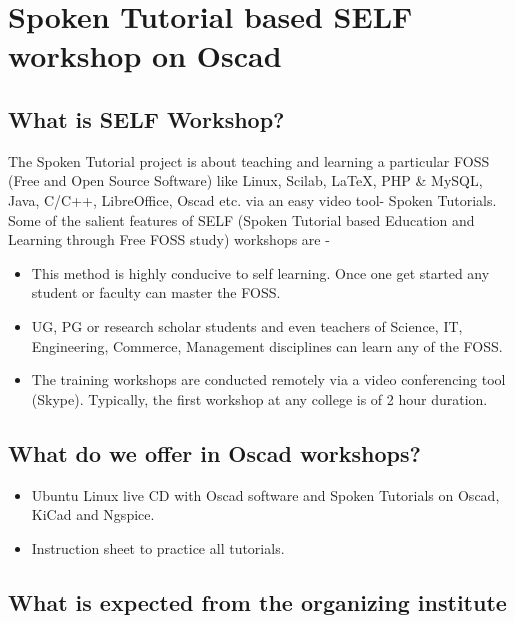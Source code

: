
\chapter{Spoken Tutorial based SELF workshop on Oscad}
\section{What is SELF Workshop?}

The Spoken Tutorial project is about teaching and learning a particular FOSS (Free and Open Source Software) like Linux, Scilab, LaTeX, PHP \& MySQL, Java, C/C++, LibreOffice, Oscad etc. via an easy video tool- Spoken Tutorials. Some of the salient features of SELF (Spoken Tutorial based Education and Learning through Free FOSS study) workshops are -
\begin{itemize}
\item This method is highly conducive to self learning. Once one get started any student or faculty can master the FOSS.
\item UG, PG or research scholar students and even teachers of Science, IT, Engineering, Commerce, Management disciplines can learn any of the FOSS.
\item The training workshops are conducted remotely via a video conferencing tool (Skype). Typically, the first workshop at any college is of 2 hour duration.
\end{itemize}

\section{What do we offer in Oscad workshops?}

\begin{itemize}
\item Ubuntu Linux live CD with Oscad software and Spoken Tutorials on Oscad, KiCad and Ngspice.
\item Instruction sheet to practice all tutorials.
\end{itemize}

\section{What is expected from the organizing institute}


